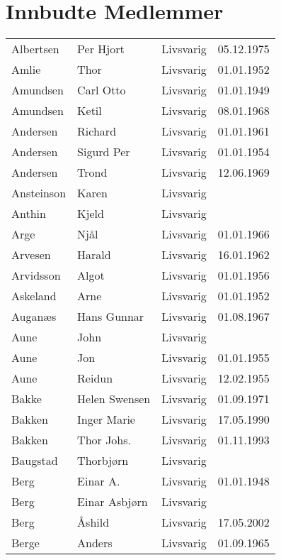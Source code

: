 ﻿
\chapter*{Innbudte Medlemmer}

    \begin{longtable}{llll}
        Albertsen	&	Per Hjort	&	Livsvarig 	&	05.12.1975	\\
        Amlie	&	Thor	&	Livsvarig 	&	01.01.1952	\\
        Amundsen	&	Carl Otto	&	Livsvarig 	&	01.01.1949	\\
        Amundsen	&	Ketil	&	Livsvarig 	&	08.01.1968	\\
        Andersen	&	Richard	&	Livsvarig 	&	01.01.1961	\\
        Andersen	&	Sigurd Per	&	Livsvarig 	&	01.01.1954	\\
        Andersen	&	Trond	&	Livsvarig 	&	12.06.1969	\\
        Ansteinson	&	Karen	&	Livsvarig 	&		\\
        Anthin	&	Kjeld	&	Livsvarig 	&		\\
        Arge	&	Njål	&	Livsvarig 	&	01.01.1966	\\
        Arvesen	&	Harald	&	Livsvarig 	&	16.01.1962	\\
        Arvidsson	&	Algot	&	Livsvarig 	&	01.01.1956	\\
        Askeland	&	Arne	&	Livsvarig 	&	01.01.1952	\\
        Auganæs	&	Hans Gunnar	&	Livsvarig 	&	01.08.1967	\\
        Aune	&	John	&	Livsvarig 	&		\\
        Aune	&	Jon	&	Livsvarig 	&	01.01.1955	\\
        Aune	&	Reidun	&	Livsvarig 	&	12.02.1955	\\
        Bakke	&	Helen Swensen	&	Livsvarig 	&	01.09.1971	\\
        Bakken	&	Inger Marie	&	Livsvarig 	&	17.05.1990	\\
        Bakken	&	Thor Johs.	&	Livsvarig 	&	01.11.1993	\\
        Baugstad	&	Thorbjørn	&	Livsvarig 	&		\\
        Berg	&	Einar A.	&	Livsvarig 	&	01.01.1948	\\
        Berg	&	Einar Asbjørn	&	Livsvarig 	&		\\
        Berg 	&	Åshild	&	Livsvarig	&	17.05.2002	\\
        Berge	&	Anders	&	Livsvarig 	&	01.09.1965	\\

\end{longtable}
